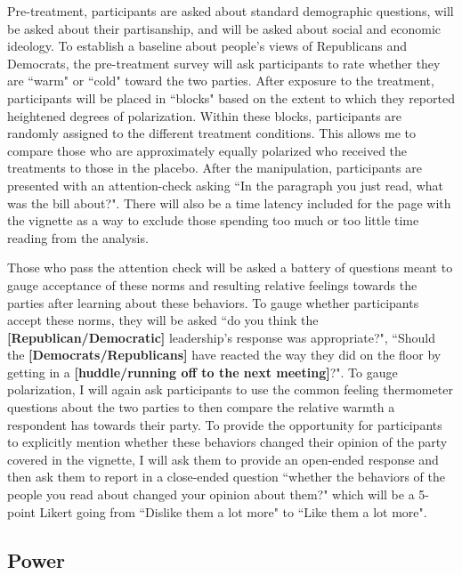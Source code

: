 \documentclass [12pt]{article}
\begin{document}
Pre-treatment, participants are asked about standard demographic questions, will be asked about their partisanship, and will be asked about social and economic ideology. To establish a baseline about people's views of Republicans and Democrats, the pre-treatment survey will ask participants to rate whether they are ``warm" or ``cold" toward the two parties. After exposure to the treatment, participants will be placed in ``blocks" based on the extent to which they reported heightened degrees of polarization. Within these blocks, participants are randomly assigned to the different treatment conditions. This allows me to compare those who are approximately equally polarized who received the treatments to those in the placebo. After the manipulation, participants are presented with an attention-check asking ``In the paragraph you just read, what was the bill about?". There will also be a time latency included for the page with the vignette as a way to exclude those spending too much or too little time reading from the analysis. 

Those who pass the attention check will be asked a battery of questions meant to gauge acceptance of these norms and resulting relative feelings towards the parties after learning about these behaviors. To gauge whether participants accept these norms, they will be asked ``do you think the \textbf{[Republican/Democratic]} leadership's response was appropriate?", ``Should the \textbf{[Democrats/Republicans]} have reacted the way they did on the floor by getting in a \textbf{[huddle/running off to the next meeting]}?". To gauge polarization, I will again ask participants to use the common feeling thermometer questions about the two parties to then compare the relative warmth a respondent has towards their party. To provide the opportunity for participants to explicitly mention whether these behaviors changed their opinion of the party covered in the vignette, I will ask them to provide an open-ended response and then ask them to report in a close-ended question ``whether the behaviors of the people you read about changed your opinion about them?" which will be a 5-point Likert going from ``Dislike them a lot more" to ``Like them a lot more". 


\subsection{Power}
\end{document}
